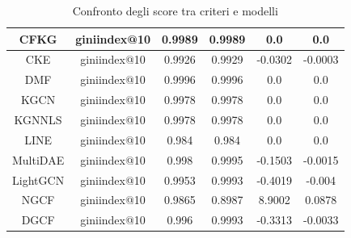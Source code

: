 \begin{table}[H]
{\begin{tabular}{|c|c|c|c|c| c|}
            CFKG             & giniindex@10       & 0.9989                           & 0.9989                         & 0.0                         & 0.0                         \\ \hline
            CKE              & giniindex@10       & 0.9926                           & 0.9929                         & -0.0302                    & -0.0003                     \\ \hline
            DMF              & giniindex@10       & 0.9996                           & 0.9996                         & 0.0                         & 0.0                         \\ \hline
            KGCN             & giniindex@10       & 0.9978                           & 0.9978                         & 0.0                         & 0.0                         \\ \hline
            KGNNLS           & giniindex@10       & 0.9978                           & 0.9978                         & 0.0                         & 0.0                         \\ \hline
            LINE             & giniindex@10       & 0.984                            & 0.984                          & 0.0                         & 0.0                         \\ \hline
            MultiDAE         & giniindex@10       & 0.998                            & 0.9995                         & -0.1503                    & -0.0015                     \\ \hline
            LightGCN         & giniindex@10       & 0.9953                           & 0.9993                          & -0.4019                    & -0.004                          \\ \hline
            NGCF             & giniindex@10       & 0.9865                           & 0.8987                         & 8.9002                      & 0.0878                      \\ \hline
            DGCF             & giniindex@10       & 0.996                           & 0.9993                         & -0.3313                    & -0.0033                     \\ \hline
        \end{tabular}
    }
    \caption{Confronto degli score tra criteri e modelli}
\end{table}



